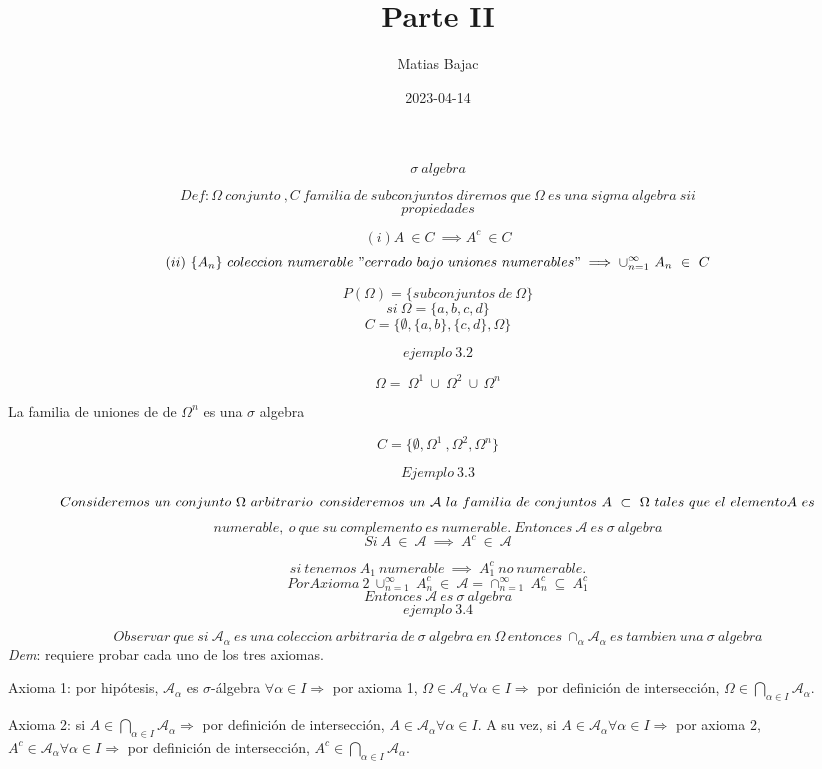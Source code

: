 \documentclass[
]{article}
\title{Parte II}
\author{Matias Bajac}
\date{2023-04-14}
\begin{document}
\maketitle

\[\sigma\ algebra\]

\[ Def: \Omega\ conjunto\ , C\ familia\ de\ subconjuntos\ diremos\ que\ \Omega\ es\ una\ sigma\ algebra\ sii\]
\[propiedades\]

\[(i) A\ \in C\ \implies A^c\ \in C\]
\[(ii)\ \{A_n\}\ coleccion\ numerable\ "cerrado\ bajo\ uniones\ numerables" \implies \cup_{n=1}^{\infty}\ {A_n}\ \in\ C\]

\[ P(\Omega) = {\{subconjuntos\ de\ \Omega\}}\]
\[ si\ \Omega = \{a,b,c,d\}\]
\[C = \{\emptyset,{\{a,b}\},{\{c,d}\},{\Omega}\}\]

\[ ejemplo\ 3.2\]

\[ \Omega=\ \Omega^1\  \cup\ \Omega^2\ \cup\, \Omega^n\]

La familia de uniones de de \(\Omega^n\) es una \(\sigma\) algebra

\[C = \{\emptyset,{\Omega^1\ ,\Omega^2, \Omega^n}\}\]

\[Ejemplo\ 3.3\]

\[ Consideremos\ un\ conjunto\ \Omega\ arbitrario\,\ consideremos\ un\ \mathcal{A}\ la\ familia\ de\ conjuntos\ A\ \subset\ \Omega\ tales\ que\ el\ elemento\\ A\ es\]
\[numerable,\  o\  que\ su\ complemento\ es\ numerable.\ Entonces\ \mathcal{A}\ es\ \sigma\ algebra\]
\[ Si\ A\ \in\ \mathcal{A}\ \implies\ A^c\ \in\ \mathcal{A}\]

\[ si\ tenemos\  A_1\ numerable\ \implies\ A_1^c\ no\ numerable.\]
\[ Por Axioma\ 2\ \cup_{n=1}^{\infty} \ A_n^c\ \in\ \mathcal{A} = \cap_{n=1}^{\infty}\ A_n^c\ \subseteq\ A_1^c\]
\[ Entonces\ \mathcal{A}\ es\ \sigma\ algebra\] \[ ejemplo\ 3.4\]

\[ Observar\ que\ si\ \mathcal{A_\alpha}\ es\ una\ coleccion\ arbitraria\ de\ \sigma\ algebra\ en\ \Omega\, entonces\ \cap_{\alpha}\mathcal{A_\alpha}\ es\ tambien\ una\ \sigma\ algebra\]
\emph{Dem}: requiere probar cada uno de los tres axiomas.

Axioma 1: por hipótesis, \(\mathcal{A}_{\alpha}\) es \(\sigma\)-álgebra
\(\forall \alpha \in I \Rightarrow\) por axioma 1,
\(\Omega \in \mathcal{A}_{\alpha} \forall \alpha \in I \Rightarrow\) por
definición de intersección,
\(\Omega \in \bigcap\limits_{\alpha \in I} \mathcal{A}_{\alpha}\).

Axioma 2: si
\(A \in \bigcap\limits_{\alpha \in I} \mathcal{A}_{\alpha} \Rightarrow\)
por definición de intersección,
\(A \in \mathcal{A}_{\alpha} \forall \alpha \in I\). A su vez, si
\(A \in \mathcal{A}_{\alpha} \forall \alpha \in I \Rightarrow\) por
axioma 2,
\(A^c \in \mathcal{A}_{\alpha} \forall \alpha \in I \Rightarrow\) por
definición de intersección,
\(A^c \in \bigcap\limits_{\alpha \in I} \mathcal{A}_{\alpha}\).
\end{document}
